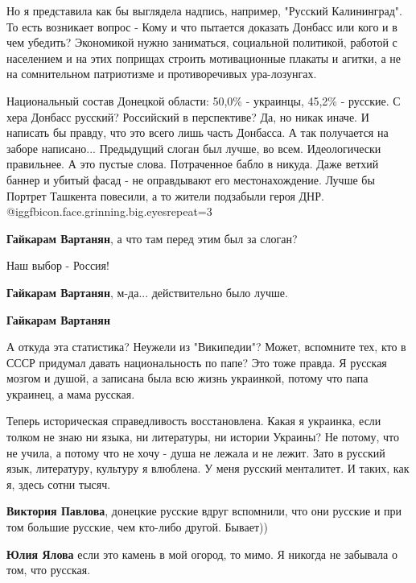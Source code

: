 \begin{itemize}
\begin{itemize}
Но я представила как бы выглядела надпись, например, "Русский Калининград". То
есть возникает вопрос - Кому и что пытается доказать Донбасс или кого и в чем
убедить? Экономикой нужно заниматься, социальной политикой, работой с
населением и на этих поприщах строить мотивационные плакаты и агитки, а не на
сомнительном патриотизме и противоречивых ура-лозунгах.

\end{itemize} %


Национальный состав Донецкой области: 50,0\% - украинцы, 45,2\% - русские. С хера
Донбасс русский? Российский в перспективе? Да, но никак иначе. И написать бы
правду, что это всего лишь часть Донбасса. А так получается на заборе
написано... Предыдущий слоган был лучше, во всем. Идеологически правильнее. А
это пустые слова. Потраченное бабло в никуда. Даже ветхий баннер и убитый фасад
- не оправдывают его местонахождение. Лучше бы Портрет Ташкента повесили, а то
жители подзабыли героя ДНР.  @igg{fbicon.face.grinning.big.eyes}{repeat=3} 

\begin{itemize} %
\textbf{Гайкарам Вартанян}, а что там перед этим был за слоган?

Наш выбор - Россия!

\textbf{Гайкарам Вартанян}, м-да... действительно было лучше.

\textbf{Гайкарам Вартанян} 

А откуда эта статистика? Неужели из "Википедии"? Может, вспомните тех, кто в
СССР придумал давать национальность по папе? Это тоже правда. Я русская мозгом
и душой, а записана была всю жизнь украинкой, потому что папа украинец, а мама
русская.

Теперь историческая справедливость восстановлена. Какая я украинка, если толком
не знаю ни языка, ни литературы, ни истории Украины? Не потому, что не учила, а
потому что не хочу - душа не лежала и не лежит. Зато в русский язык,
литературу, культуру я влюблена. У меня русский менталитет. И таких, как я,
здесь сотни тысяч.


\textbf{Виктория Павлова}, донецкие русские вдруг вспомнили, что они русские и при том большие русские, чем кто-либо другой. Бывает))

\textbf{Юлия Ялова} если это камень в мой огород, то мимо. Я никогда не забывала о том, что русская.


\end{itemize}
\end{itemize}
